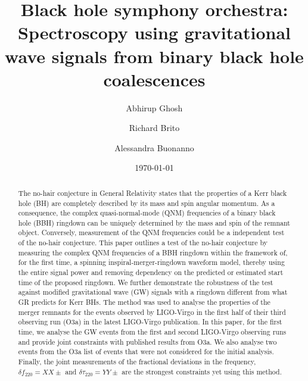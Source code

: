 \documentclass[twocolumn,prd,superscriptaddress,amsfonts,amssymb,amsmath,preprintnumbers]{revtex4-1}
\newcommand{\df}[1]{\delta f_{\text{#1}}}
\newcommand{\dtau}[1]{\delta \tau_{\text{#1}}}
\begin{document}
\title{Black hole symphony orchestra: Spectroscopy using gravitational wave signals from binary black hole coalescences}

\author{Abhirup Ghosh}
\author{Richard Brito}
\author{Alessandra Buonanno}

\date{\today}


\begin{abstract}
The no-hair conjecture in General Relativity states that the properties of a Kerr black hole (BH) are completely described by its mass and spin angular momentum. As a consequence, the complex quasi-normal-mode (QNM) frequencies of a binary black hole (BBH) ringdown can be uniquely determined by the mass and spin of the remnant object. Conversely, measurement of the QNM frequencies could be a independent test of the no-hair conjecture. This paper outlines a test of the no-hair conjecture by measuring the complex QNM frequencies of a BBH ringdown within the framework of, for the first time, a spinning inspiral-merger-ringdown waveform model, thereby using the entire signal power and removing dependency on the predicted or estimated start time of the proposed ringdown. We further demonstrate the robustness of the test against modified gravitational wave (GW) signals with a ringdown different from what GR predicts for Kerr BHs. The method was used to analyse the properties of the merger remnants for the events observed by LIGO-Virgo in the first half of their third observing run (O3a) in the latest LIGO-Virgo publication. In this paper, for the first time, we analyse the GW events from the first and second LIGO-Virgo observing runs and provide joint constraints with published results from O3a. We also analyse two events from the O3a list of events that were not considered for the initial analysis. Finally, the joint measurements of the fractional deviations in the frequency, $\df{220} = XX \pm$ and $\dtau{220} = YY \pm$ are the strongest constraints yet using this method. %
\end{abstract}
\end{document}
